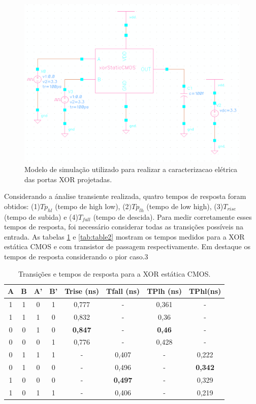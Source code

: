 \documentclass[a4paper,10pt] {article}
\begin{document}
\begin{figure}[h]
	\centering
	\includegraphics[scale=0.2]{xorStaticCMOStest.png}
	\caption{Modelo de simulação utilizado para realizar a caracterizacao elétrica das portas XOR projetadas.}
	\label{fig:xorTest}
\end{figure}

Considerando a ánalise transiente realizada, quatro tempos de resposta foram obtidos: (1)$Tp_{hl}$ (tempo de high low),
(2$)Tp_{lh}$ (tempo de low high), (3)$T_{rise}$ (tempo de subida) e (4)$T_{fall}$ (tempo de descida).
Para medir corretamente esses tempos de resposta, foi necessário considerar todas as transições possíveis na entrada.
As tabelas \ref{tab:table1} e \ref{tab:table2} mostram os tempos medidos para a XOR estática CMOS e com transistor de passagem respectivamente.
Em destaque os tempos de resposta considerando o pior caso.3

\begin{table} [h]
  \centering
  \caption{Transições e tempos de resposta para a XOR estática CMOS.}
  \begin{tabular}{c|c|c|c|c|c|c|c}
    \hline
    A & B & A' & B' & Trise (ns) & Tfall (ns) & TPlh (ns) & TPhl(ns) \\ \hline
    1 & 1 & 0 &  1  & 0,777 & - & 0,361 & - \\ \hline
    1 & 1 & 1 &  0  & 0,832 & - & 0,36 & - \\ \hline
    0 & 0 & 1 &  0  & \bf{0,847} & - & \bf{0,46} & - \\ \hline
    0 & 0 & 0 &  1  & 0,776 & - & 0,428 & - \\ \hline
    0 & 1 & 1 &  1  & - & 0,407 & - & 0,222 \\ \hline
    0 & 1 & 0 &  0  & - & 0,496 & - & \bf{0,342} \\ \hline
    1 & 0 & 0 &  0  & - & \bf{0,497} & - & 0,329 \\ \hline
    1 & 0 & 1 &  1  & - & 0,406 & - & 0,219 \\ \hline
  \end{tabular}
  \label{tab:table1}
\end{table}
\end{document}
